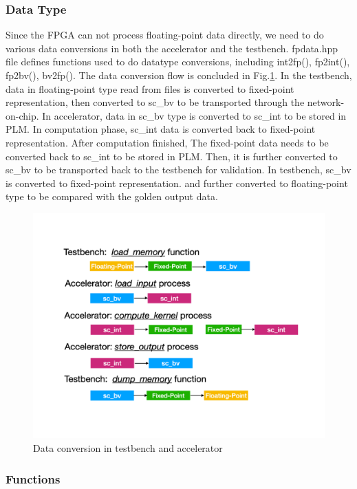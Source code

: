 \subsubsection{Data Type}

Since the FPGA can not process floating-point data directly, we need to do
various data conversions in both the accelerator and the testbench. fpdata.hpp
file defines functions used to do datatype conversions, including int2fp(),
fp2int(), fp2bv(), bv2fp(). The data conversion flow is concluded in
Fig.\ref{fig-data-convert}. In the testbench, data in floating-point type read
from files is converted to fixed-point representation, then converted to sc\_bv
to be transported through the network-on-chip. In accelerator, data in sc\_bv
type is converted to sc\_int to be stored in PLM. In computation phase, sc\_int
data is converted back to fixed-point representation. After computation
finished, The fixed-point data needs to be converted back to sc\_int to be
stored in PLM. Then, it is further converted to sc\_bv to be transported back to
the testbench for validation. In testbench, sc\_bv is converted to fixed-point
representation. and further converted to floating-point type to be compared with
the golden output data. \\

\begin{figure}[t]
\centering
\captionsetup{justification=centering, format=hang}
\includegraphics[width=0.85\columnwidth]{figures/data-conversion}
\caption{Data conversion in testbench and accelerator}
\label{fig-data-convert}
\end{figure}



\subsubsection{Functions}

